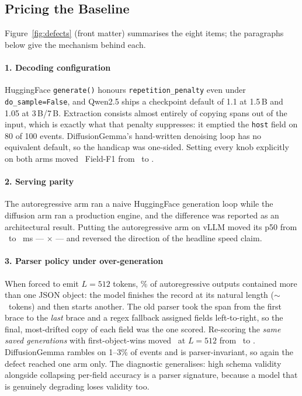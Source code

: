 \subsection{Pricing the Baseline}

Figure~\ref{fig:defects} (front matter) summarises the eight items; the
paragraphs below give the mechanism behind each.

\paragraph{1. Decoding configuration}
HuggingFace \texttt{generate()} honours \texttt{repetition\_penalty} even
under \texttt{do\_sample=False}, and Qwen2.5 ships a checkpoint default of
1.1 at 1.5\,B and 1.05 at 3\,B/7\,B. Extraction consists almost entirely of
copying spans out of the input, which is exactly what that penalty suppresses:
it emptied the \texttt{host} field on 80 of 100 events. DiffusionGemma's
hand-written denoising loop has no equivalent default, so the handicap was
one-sided. Setting every knob explicitly on both arms moved \ARoneb\ Field-F1
from \ to .

\paragraph{2. Serving parity}
The autoregressive arm ran a naive HuggingFace generation loop while the
diffusion arm ran a production engine, and the difference was reported as an
architectural result. Putting the autoregressive arm on vLLM moved its p50
from \ to ~ms --- $\times$ ---
and reversed the direction of the headline speed claim.

\paragraph{3. Parser policy under over-generation}
When forced to emit $L{=}512$ tokens, \rambleRate\% of autoregressive outputs
contained more than one JSON object: the model finishes the record at its
natural length ($\sim$\naturalLar\ tokens) and then starts another. The old
parser took the span from the first brace to the \emph{last} brace and a
regex fallback assigned fields left-to-right, so the final, most-drifted copy
of each field was the one scored. Re-scoring the \emph{same saved
generations} with first-object-wins moved \ARthree\ at $L{=}512$ from
\ to . DiffusionGemma rambles on 1--3\% of
events and is parser-invariant, so again the defect reached one arm only.
The diagnostic generalises: high schema validity alongside collapsing
per-field accuracy is a parser signature, because a model that is genuinely
degrading loses validity too.

